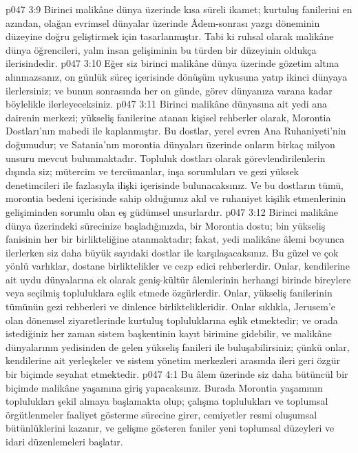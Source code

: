 \vs p047 3:9 Birinci malikâne dünya üzerinde kısa süreli ikamet; kurtuluş fanilerini en azından, olağan evrimsel dünyalar üzerinde Âdem\hyp{}sonrası yazgı döneminin düzeyine doğru geliştirmek için tasarlanmıştır. Tabi ki ruhsal olarak malikâne dünya öğrencileri, yalın insan gelişiminin bu türden bir düzeyinin oldukça ilerisindedir.
\vs p047 3:10 Eğer siz birinci malikâne dünya üzerinde gözetim altına alınmazsanız, on günlük süreç içerisinde dönüşüm uykusuna yatıp ikinci dünyaya ilerlersiniz; ve bunun sonrasında her on günde, görev dünyanıza varana kadar böylelikle ilerleyeceksiniz.
\vs p047 3:11 Birinci malikâne dünyasına ait yedi ana dairenin merkezi; yükseliş fanilerine atanan kişisel rehberler olarak, Morontia Dostları’nın mabedi ile kaplanmıştır. Bu dostlar, yerel evren Ana Ruhaniyeti’nin doğumudur; ve Satania’nın morontia dünyaları üzerinde onların birkaç milyon unsuru mevcut bulunmaktadır. Topluluk dostları olarak görevlendirilenlerin dışında siz; mütercim ve tercümanlar, inşa sorumluları ve gezi yüksek denetimcileri ile fazlasıyla ilişki içerisinde bulunacaksınız. Ve bu dostların tümü, morontia bedeni içerisinde sahip olduğunuz akıl ve ruhaniyet kişilik etmenlerinin gelişiminden sorumlu olan eş güdümsel unsurlardır.
\vs p047 3:12 Birinci malikâne dünya üzerindeki sürecinize başladığınızda, bir Morontia dostu; bin yükseliş fanisinin her bir birlikteliğine atanmaktadır; fakat, yedi malikâne âlemi boyunca ilerlerken siz daha büyük sayıdaki dostlar ile karşılaşacaksınız. Bu güzel ve çok yönlü varlıklar, dostane birliktelikler ve cezp edici rehberlerdir. Onlar, kendilerine ait uydu dünyalarına ek olarak geniş\hyp{}kültür âlemlerinin herhangi birinde bireylere veya seçilmiş topluluklara eşlik etmede özgürlerdir. Onlar, yükseliş fanilerinin tümünün gezi rehberleri ve dinlence birliktelikleridir. Onlar sıklıkla, Jerusem’e olan dönemsel ziyaretlerinde kurtuluş topluluklarına eşlik etmektedir; ve orada istediğiniz her zaman sistem başkentinin kayıt birimine gidebilir, ve malikâne dünyalarının yedisinden de gelen yükseliş fanileri ile buluşabilirsiniz; çünkü onlar, kendilerine ait yerleşkeler ve sistem yönetim merkezleri arasında ileri geri özgür bir biçimde seyahat etmektedir.
\vs p047 4:1 Bu âlem üzerinde siz daha bütüncül bir biçimde malikâne yaşamına giriş yapacaksınız. Burada Morontia yaşamının toplulukları şekil almaya başlamakta olup; çalışma toplulukları ve toplumsal örgütlenmeler faaliyet gösterme sürecine girer, cemiyetler resmi oluşumsal bütünlüklerini kazanır, ve gelişme gösteren faniler yeni toplumsal düzeyleri ve idari düzenlemeleri başlatır.
